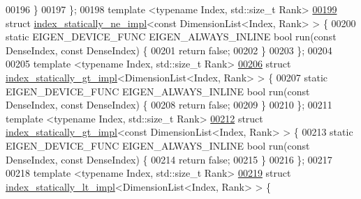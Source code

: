 \begin{DoxyCode}
00196   \}
00197 \};
00198 \textcolor{keyword}{template} <\textcolor{keyword}{typename} Index, std::\textcolor{keywordtype}{size\_t} Rank>
\hyperlink{struct_eigen_1_1internal_1_1index__statically__ne__impl_3_01const_01_dimension_list_3_01_index_00_01_rank_01_4_01_4}{00199} \textcolor{keyword}{struct }\hyperlink{struct_eigen_1_1internal_1_1index__statically__ne__impl}{index\_statically\_ne\_impl}<const DimensionList<Index, Rank> > \{
00200   \textcolor{keyword}{static} EIGEN\_DEVICE\_FUNC EIGEN\_ALWAYS\_INLINE \textcolor{keywordtype}{bool} run(\textcolor{keyword}{const} DenseIndex, \textcolor{keyword}{const} DenseIndex) \{
00201     \textcolor{keywordflow}{return} \textcolor{keyword}{false};
00202   \}
00203 \};
00204 
00205 \textcolor{keyword}{template} <\textcolor{keyword}{typename} Index, std::\textcolor{keywordtype}{size\_t} Rank>
\hyperlink{struct_eigen_1_1internal_1_1index__statically__gt__impl_3_01_dimension_list_3_01_index_00_01_rank_01_4_01_4}{00206} \textcolor{keyword}{struct }\hyperlink{struct_eigen_1_1internal_1_1index__statically__gt__impl}{index\_statically\_gt\_impl}<DimensionList<Index, Rank> > \{
00207   \textcolor{keyword}{static} EIGEN\_DEVICE\_FUNC EIGEN\_ALWAYS\_INLINE \textcolor{keywordtype}{bool} run(\textcolor{keyword}{const} DenseIndex, \textcolor{keyword}{const} DenseIndex) \{
00208     \textcolor{keywordflow}{return} \textcolor{keyword}{false};
00209   \}
00210 \};
00211 \textcolor{keyword}{template} <\textcolor{keyword}{typename} Index, std::\textcolor{keywordtype}{size\_t} Rank>
\hyperlink{struct_eigen_1_1internal_1_1index__statically__gt__impl_3_01const_01_dimension_list_3_01_index_00_01_rank_01_4_01_4}{00212} \textcolor{keyword}{struct }\hyperlink{struct_eigen_1_1internal_1_1index__statically__gt__impl}{index\_statically\_gt\_impl}<const DimensionList<Index, Rank> > \{
00213   \textcolor{keyword}{static} EIGEN\_DEVICE\_FUNC EIGEN\_ALWAYS\_INLINE \textcolor{keywordtype}{bool} run(\textcolor{keyword}{const} DenseIndex, \textcolor{keyword}{const} DenseIndex) \{
00214     \textcolor{keywordflow}{return} \textcolor{keyword}{false};
00215   \}
00216 \};
00217 
00218 \textcolor{keyword}{template} <\textcolor{keyword}{typename} Index, std::\textcolor{keywordtype}{size\_t} Rank>
\hyperlink{struct_eigen_1_1internal_1_1index__statically__lt__impl_3_01_dimension_list_3_01_index_00_01_rank_01_4_01_4}{00219} \textcolor{keyword}{struct }\hyperlink{struct_eigen_1_1internal_1_1index__statically__lt__impl}{index\_statically\_lt\_impl}<DimensionList<Index, Rank> > \{

\end{DoxyCode}
